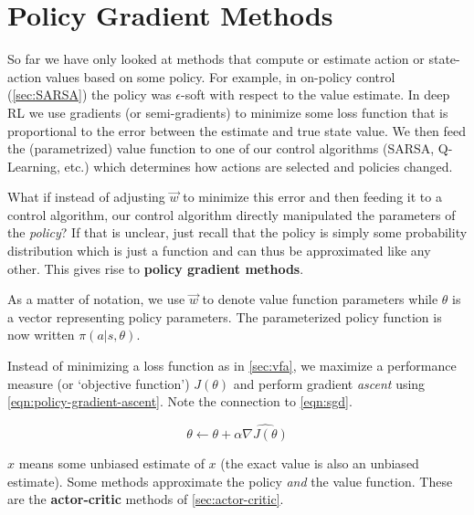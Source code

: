 \documentclass[11pt]{report}
\begin{document}
\section{Policy Gradient Methods}\label{sec:policy-gradient}

So far we have only looked at methods that compute or estimate action or state-action values based on some policy. For example, in on-policy control (\autoref{sec:SARSA}) the policy was $\epsilon$-soft with respect to the value estimate. In deep RL we use gradients (or semi-gradients) to minimize some loss function that is proportional to the error between the estimate and true state value. We then feed the (parametrized) value function to one of our control algorithms (SARSA, Q-Learning, etc.) which determines how actions are selected and policies changed.

What if instead of adjusting $\vec{w}$ to minimize this error and then feeding it to a control algorithm, our control algorithm directly manipulated the parameters of the \textit{policy}? If that is unclear, just recall that the policy is simply some probability distribution which is just a function and can thus be approximated like any other. This gives rise to \textbf{policy gradient methods}.

As a matter of notation, we use $\vec{w}$ to denote value function parameters while $\theta$ is a vector representing policy parameters. The parameterized policy function is now written $\pi(a | s, \theta)$.

Instead of minimizing a loss function as in \autoref{sec:vfa}, we maximize a performance measure (or `objective function') $J(\theta)$ and perform gradient \textit{ascent} using \autoref{eqn:policy-gradient-ascent}. Note the connection to \autoref{eqn:sgd}.

\begin{equation}
	\label{eqn:policy-gradient-ascent}
	\theta \xleftarrow{} \theta + \alpha \widehat{\nabla J(\theta)}
\end{equation}

$\widehat{x}$ means some unbiased estimate of $x$ (the exact value is also an unbiased estimate). Some methods approximate the policy \textit{and} the value function. These are the \textbf{actor-critic} methods of \autoref{sec:actor-critic}.
\end{document}

